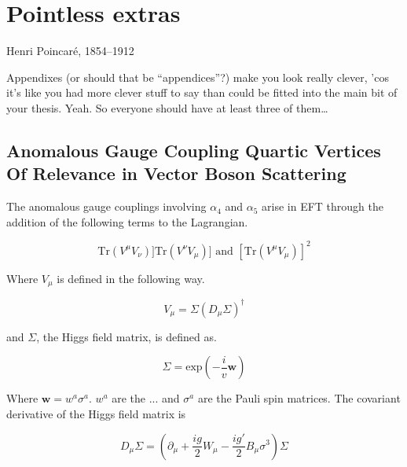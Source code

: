 \chapter{Pointless extras}
\label{app:Pointless}

%
{Henri Poincar\'e, 1854--1912}

Appendixes (or should that be ``appendices''?) make you look really clever, 'cos
it's like you had more clever stuff to say than could be fitted into the main
bit of your thesis. Yeah. So everyone should have at least three of them\dots

\section{Anomalous Gauge Coupling Quartic Vertices Of Relevance in Vector Boson Scattering}
\label{sec:Duh}

The anomalous gauge couplings involving $\alpha_{4}$ and $\alpha_{5}$ arise in EFT through the addition of the following terms to the Lagrangian.

\begin{equation}
\text{Tr}(V^{\mu}V_{\nu})] \text{Tr}(V^{\nu}V_{\mu})] \text{ and } [\text{Tr}(V^{\mu}V_{\mu})]^{2} 
\end{equation}

Where $V_{\mu}$ is defined in the following way.

\begin{equation}
V_{\mu} = \Sigma(D_{\mu}\Sigma)^{\dagger}
\end{equation}

and $\Sigma$, the Higgs field matrix, is defined as. 

\begin{equation}
\Sigma = \text{exp}(-\frac{i}{v}\textbf{w})
\end{equation}

Where $\textbf{w} = w^{a} \sigma^{a}$.  $w^{a}$ are the ... and $\sigma^{a}$ are the Pauli spin matrices.  The covariant derivative of the Higgs field matrix is

\begin{equation}
D_{\mu}\Sigma = (\partial_{\mu} + \frac{ig}{2}W_{\mu} - \frac{ig'}{2}B_{\mu}\sigma^{3})\Sigma
\end{equation}

